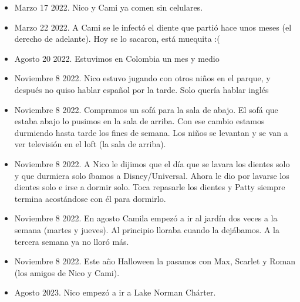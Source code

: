 \documentclass[12pt]{article}
\begin{document}
\begin{itemize}
  \item Marzo 17 2022. Nico y Cami ya comen sin celulares.
  \item Marzo 22 2022. A Cami se le infect\'o el diente que parti\'o hace unos meses (el derecho de adelante). Hoy se lo sacaron, est\'a muequita :(
  \item Agosto 20 2022. Estuvimos en Colombia un mes y medio
  \item Noviembre 8 2022. Nico estuvo jugando con otros ni\~nos en el parque, y despu\'es no quiso hablar espa\~nol por la tarde. Solo quer\'ia hablar ingl\'es
  \item Noviembre 8 2022. Compramos un sof\'a para la sala de abajo. El sof\'a que estaba abajo lo pusimos en la sala de arriba. Con ese cambio estamos durmiendo hasta tarde los fines de semana. Los ni\~nos se levantan y se van a ver televisi\'on en el loft (la sala de arriba).
  \item Noviembre 8 2022. A Nico le dijimos que el d\'ia que se lavara los dientes solo y que durmiera solo \'ibamos a Disney/Universal. Ahora le dio por lavarse los dientes solo e irse a dormir solo. Toca repasarle los dientes y Patty siempre termina acost\'andose con \'el para dormirlo.
  \item Noviembre 8 2022. En agosto Camila empez\'o a ir al jard\'in dos veces a la semana (martes y jueves). Al principio lloraba cuando la dej\'abamos. A la tercera semana ya no llor\'o m\'as.
  \item Noviembre 8 2022. Este a\~no Halloween la pasamos con Max, Scarlet y Roman (los amigos de Nico y Cami).
  \item Agosto 2023. Nico empez\'o a ir a Lake Norman Ch\'arter.
  
 \end{itemize}
\end{document}
